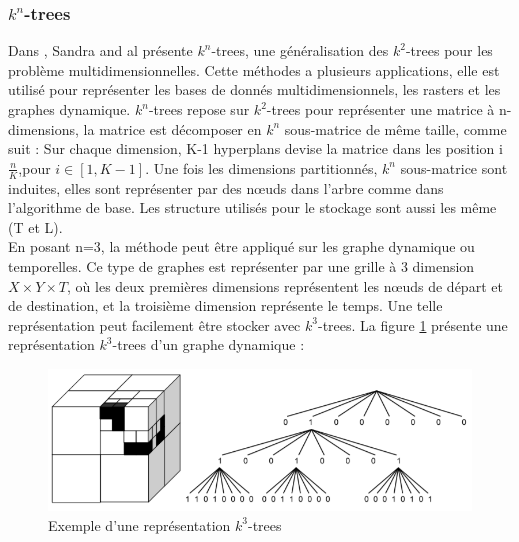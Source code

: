 \subsubsection{$k^n$-trees}
Dans \citep{de2013compact}, Sandra and al présente $k^n$-trees, une généralisation des $k^2$-trees pour les problème multidimensionnelles. Cette méthodes a plusieurs applications, elle est utilisé pour représenter les bases de donnés multidimensionnels, les rasters et les graphes dynamique. $k^n$-trees repose sur $k^2$-trees pour représenter une matrice à n-dimensions, la matrice est décomposer en $k^n$ sous-matrice de même taille, comme suit : Sur chaque dimension, K-1 hyperplans devise la matrice dans les position i$\frac{n}{K}$,pour $i \in [1, K-1]$. Une fois les dimensions partitionnés, $k^n$ sous-matrice sont induites, elles sont représenter  par des nœuds dans l'arbre comme dans l'algorithme de base. Les structure utilisés pour le stockage sont aussi les même (T et L).\\
En posant n=3, la méthode peut être appliqué sur les graphe dynamique ou temporelles. Ce type de graphes est représenter par une grille à 3 dimension $X \times Y \times T$, où les deux premières dimensions représentent les nœuds de départ et de destination, et la troisième dimension représente le temps. Une telle représentation peut facilement être stocker avec $k^3$-trees.
La figure \ref{kn-trees} présente une représentation $k^3$-trees d'un graphe dynamique :

\begin{figure}[H]
\begin{center}
\includegraphics[height=100 pt, width=380 pt]{./ressources/image/kn-trees.png} 
\end{center}
\caption{Exemple d'une représentation $k^3$-trees}
\label{kn-trees}
\end{figure}



